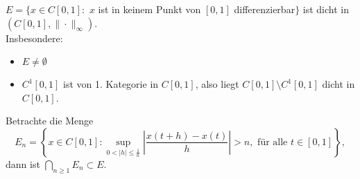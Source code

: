 \begin{satz}
	$E = \{ x \in C[0, 1]:$ $x$ ist in keinem Punkt von $[0, 1]$ differenzierbar$\}$ ist dicht in $(C[0, 1], \|\cdot\|_{\infty})$. \\
	Insbesondere:
 		\begin{itemize}
			\item $E \neq \emptyset$
			\item $C^{1}[0, 1]$ ist von 1. Kategorie in $C[0, 1]$, also liegt $C[0, 1] \setminus C^{1}[0, 1]$ dicht in $C[0, 1]$.
		\end{itemize}
\end{satz}

\begin{beweis}
	Betrachte die Menge
	\[ E_{n} = \left\{ x \in C[0, 1]: \sup_{0 < |h| \leq \frac{1}{n}} \left| \frac{x(t + h) - x(t)}{h} \right| > n, \text{ für alle } t \in [0, 1] \right\}, \]
	dann ist $\bigcap_{n \geq 1} E_{n} \subset E$. 
	
	\newpage %
	

\end{beweis}
